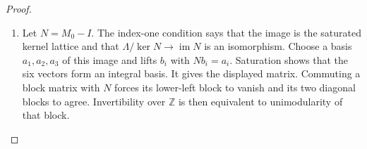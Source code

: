 \begin{proof}
\begin{enumerate}[label={$\langle1\rangle$\arabic*.}]
\item Let $N=M_0-I$.  The index-one condition says that the image
is the saturated kernel lattice and that
$\Lambda/\ker N\to\operatorname{im}N$ is an isomorphism.
Choose a basis $a_1,a_2,a_3$ of this image and lifts $b_i$ with
$Nb_i=a_i$.  Saturation shows that the six vectors form an
integral basis.  It gives the displayed matrix.  Commuting a
block matrix with $N$ forces its lower-left block to vanish
and its two diagonal blocks to agree.  Invertibility over
$\mathbb Z$ is then equivalent to unimodularity of that block.

\end{enumerate}
\end{proof}

